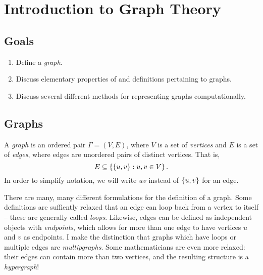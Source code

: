 \documentclass[m3380-lec-main.tex]{subfiles}
\begin{document}
\chapter{Introduction to Graph Theory}

\section*{Goals}
\begin{enumerate}[1.~]\setlength{\itemsep}{0pt}
\item Define a \emph{graph}.
\item Discuss elementary properties of and definitions pertaining to graphs.
\item Discuss several different methods for representing graphs computationally.
\end{enumerate}

\section{Graphs}
\begin{defn} A \emph{graph} is an ordered pair $\Gamma=(V,E)$, where $V$ is a set of \emph{vertices} and $E$ is a set of \emph{edges}, where edges are unordered pairs of distinct vertices. That is, \[E \subseteq \left\{\left\{u,v\right\}:u,v\in V\right\}.\]
In order to simplify notation, we will write $uv$ instead of $\left\{u,v\right\}$ for an edge.
\end{defn}

\begin{rem} There are many, many different formulations for the definition of a graph. Some definitions are suffiently relaxed that an edge can loop back from a vertex to itself -- these are generally called \emph{loops}. Likewise, edges can be defined as independent objects with \emph{endpoints}, which allows for more than one edge to have vertices $u$ and $v$ as endpoints. I make the distinction that graphs which have loops or multiple edges are \emph{multipgraphs}. Some mathematicians are even more relaxed: their edges can contain more than two vertices, and the resulting structure is a \emph{hypergraph}!
\end{rem}
\end{document}
